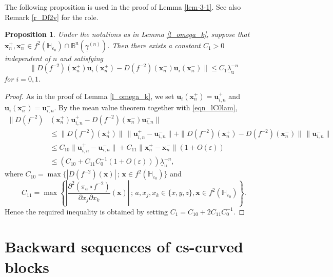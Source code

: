 \documentclass{amsart}
\newtheorem{prop}[thm]{Proposition}
\theoremstyle{definition}
\numberwithin{equation}{section}
\numberwithin{figure}{section}
\begin{document}
The following proposition is used in the proof of Lemma \ref{lem-3-1}.
See also Remark \ref{r_Df2v} for the role.


\begin{prop}\label{c_Df2v}
Under the notations as in Lemma \ref{l_omega_k}, 
suppose that $\boldsymbol{x}_n^+,\boldsymbol{x}_n^-\in f^2(\mathbb{H}_{\varepsilon_0})\cap \mathbb{B}^{\mathrm{u}}(\underline{\gamma}^{(n)})$.
Then there exists a constant $C_1>0$ independent of $n$ and satisfying 
$$\|D(f^{-2})(\boldsymbol{x}_n^+)\boldsymbol{u}_i(\boldsymbol{x}_n^+)-D(f^{-2})(\boldsymbol{x}_n^-)\boldsymbol{u}_i(\boldsymbol{x}_n^-)\|\leq C_1\underline{\lambda}_{\mathrm{u}}^{-n}$$
for $i=0,1$.
\end{prop}
\begin{proof}
As in the proof of Lemma \ref{l_omega_k}, we set $\boldsymbol{u}_i(\boldsymbol{x}_n^+)=\boldsymbol{u}_{i,n}^+$ and $\boldsymbol{u}_i(\boldsymbol{x}_n^-)=\boldsymbol{u}_{i,n}^-$.
By the mean value theorem together with \eqref{eqn_lC0lam}, 
\begin{align*}
\|D(f^{-2})&(\boldsymbol{x}_n^+)\boldsymbol{u}_{i,n}^+-D(f^{-2})(\boldsymbol{x}_n^-)\boldsymbol{u}_{i,n}^-\|\\
&\leq 
\| D(f^{-2})(\boldsymbol{x}_n^+)\|\,\|\boldsymbol{u}_{i,n}^+-\boldsymbol{u}_{i,n}^-\|+
\|D(f^{-2})(\boldsymbol{x}_n^+)-D(f^{-2})(\boldsymbol{x}_n^-)\|\,\|\boldsymbol{u}_{i,n}^-\|\\
&\leq C_{10}\|\boldsymbol{u}_{i,n}^+-\boldsymbol{u}_{i,n}^-\|+C_{11}\|\boldsymbol{x}_n^+-\boldsymbol{x}_n^-\|(1+O(\varepsilon))\\
&\leq (C_{10}+C_{11}C_0^{-1}(1+O(\varepsilon)))\underline{\lambda}_{\mathrm{u}}^{-n},
\end{align*}
where $C_{10}=\max\bigl\{|D(f^{-2})(\boldsymbol{x})|\,;\,\boldsymbol{x}\in f^2(\mathbb{H}_{\varepsilon_0})\bigr\}$ and 
$$C_{11}=\max\left\{ \left|\frac{\partial^2(\pi_a\circ f^{-2})}{\partial x_j\partial x_k}(\boldsymbol{x})\right|\,;\, 
a,x_j,x_k\in \{x,y,z\},\boldsymbol{x}\in f^2(\mathbb{H}_{\varepsilon_0})\right\}.$$
Hence the required inequality is obtained by setting $C_1=C_{10}+2C_{11}C_0^{-1}$.
\end{proof}





\section{Backward sequences of cs-curved blocks}\label{S_BWS}
\end{document}
